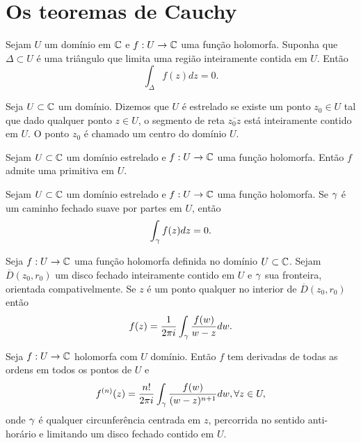 \section[Os teoremas de Cauchy]{Os teoremas de Cauchy}

\begin{teorema}
\label{teo:cauchy-goursat}
Sejam $U$ um domínio em $\mathbb{C}$ e $f: U \to \mathbb{C}$ uma função holomorfa. Suponha que $\Delta \subset U$ é uma triângulo que limita
uma região inteiramente contida em $U$. Então
\begin{equation*}
    \int_{\Delta} f(z) dz = 0.
\end{equation*}
\end{teorema}


\begin{definicao}
Seja $U\subset\mathbb{C}$ um domínio. Dizemos que $U$ é estrelado se existe um ponto $z_0\in U$
tal que dado qualquer ponto $z\in U$, o segmento de reta $\overline{z_0z}$ está inteiramente contido em $U$. 
O ponto $z_0$ é chamado um centro do domínio $U$.
\end{definicao}


\begin{corolario}
Sejam $U\subset\mathbb{C}$ um domínio estrelado e $f:U\to\mathbb{C}$ uma
função holomorfa. Então $f$ admite uma primitiva em $U$.
\end{corolario}


\begin{corolario}
Sejam $U\subset\mathbb{C}$ um domínio estrelado e $f:U\to\mathbb{C}$ uma função holomorfa.
Se $\gamma$ é um caminho fechado suave por partes em $U$, então
\begin{equation*}
    \int_{\gamma} f(z) dz = 0.
\end{equation*}
\end{corolario}


\begin{teorema}
\label{teo:form-integral-cauchy}
Seja $f:U \to \mathbb{C}$ uma função holomorfa definida no domínio $U\subset\mathbb{C}$.
Sejam $\overline{D}(z_0, r_0)$ um disco fechado inteiramente contido em $U$ e $\gamma$ sua fronteira, orientada compativelmente. 
Se $z$ é um ponto qualquer no interior de $\overline{D}(z_0, r_0)$ então
\begin{equation*}
    f(z) = \frac{1}{2\pi i}\int_{\gamma} \frac{f(w)}{w-z}dw.
\end{equation*}
\end{teorema}


\begin{corolario}
Seja $f:U\to\mathbb{C}$ holomorfa com $U$ domínio. Então $f$ tem derivadas de todas as ordens em todos os pontos de $U$ e
\begin{equation*}
    f^{(n)}(z) = \frac{n!}{2\pi i}\int_{\gamma} \frac{f(w)}{(w-z)^{n+1}}dw, \forall z\in U,
\end{equation*}
onde $\gamma$ é qualquer circunferência centrada em $z$, percorrida no sentido anti-horário e limitando um disco fechado contido em $U$.
\end{corolario}


